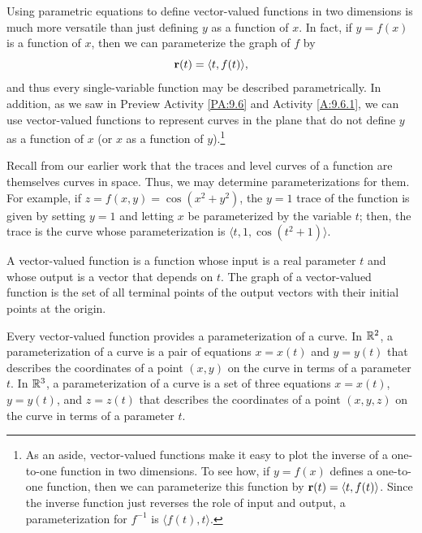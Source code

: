 %



Using parametric equations to define vector-valued functions in two
dimensions is much more versatile than just defining $y$ as a function
of $x$. In fact, if $y = f(x)$ is a function of $x$, then we can
parameterize the graph of $f$ by
\[\mathbf{r}(t) = \langle t, f(t) \rangle,\]
and thus every single-variable function may be described
parametrically.  In addition, as we saw in Preview Activity
\ref{PA:9.6} and Activity \ref{A:9.6.1}, we can use vector-valued
functions to represent curves in the plane that do not define $y$ as a
function of $x$ (or $x$ as a function of $y$).\footnote{As an aside,
  vector-valued functions make it easy to plot the inverse of a
  one-to-one function in two dimensions. To see how, if $y = f(x)$
  defines a one-to-one function, then we can parameterize this
  function by $\mathbf{r}(t) = \langle t, f(t) \rangle$. Since the inverse
  function just reverses the role of input and output, a
  parameterization for $f^{-1}$ is $\langle f(t), t \rangle$.}





Recall from our earlier work that the traces and level curves of a
function are themselves curves in space.  Thus, we may determine 
parameterizations for them.  For example, if $z = f(x,y) = \cos(x^2 +
y^2)$, the $y = 1$ trace of the function is given by setting $y = 1$
and letting $x$ be parameterized by the variable $t$; then, the trace
is the curve whose parameterization is $\langle t, 1, \cos(t^2 + 1)
\rangle.$




\begin{summary}
\item A vector-valued function is a function whose input is a real
  parameter $t$ and whose output is a vector that depends on $t$. The
  graph of a vector-valued function is the set of all terminal points
  of the output vectors with their initial points at the origin.
\item Every vector-valued function provides a parameterization of a
  curve. In $\mathbb{R}^2$, a parameterization of a curve is a pair of
  equations $x = x(t)$ and $y = y(t)$ that describes the coordinates
  of a point $(x,y)$ on the curve in terms of a parameter $t$. In
  $\mathbb{R}^3$, a parameterization of a curve is a set of three equations $x
  = x(t)$, $y=y(t)$, and $z = z(t)$ that describes the coordinates of
  a point $(x,y,z)$ on the curve in terms of a parameter $t$.
\end{summary}



\nin \hrulefill



\clearpage
